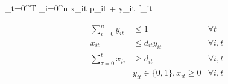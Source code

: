 \sum_{t=0}^T \sum_{i=0}^n x_{it} p_{it} + y_{it} f_{it}

\begin{align*}
\sum_{i=0}^n y_{it} & \leq 1 & \forall t \\
x_{it} & \leq d_{it} y_{it} & \forall i,t \\
\sum_{ \tau = 0}^t x_{i\tau} & \geq d_{it} & \forall i,t \\
& y_{it} \in \{0,1\}, x_{it} \geq 0 & \forall i,t \\
\end{align*}